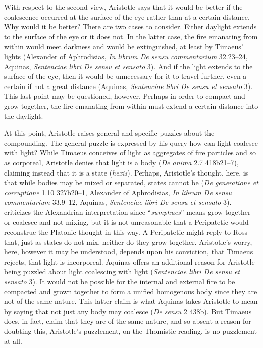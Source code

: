 With respect to the second view, Aristotle says that it would be better if the coalescence occurred at the surface of the eye rather than at a certain distance. Why would it be better? There are two cases to consider. Either daylight extends to the surface of the eye or it does not. In the latter case, the fire emanating from within would meet darkness and would be extinguished, at least by Timaeus' lights (Alexander of Aphrodisias, \emph{In librum De sensu commentarium} 32.23--24, Aquinas, \emph{Sentenciae libri De sensu et sensato} 3). And if the light extends to the surface of the eye, then it would be unnecessary for it to travel further, even a certain if not a great distance (Aquinas, \emph{Sentenciae libri De sensu et sensato} 3). This last point may be questioned, however. Perhaps in order to compact and grow together, the fire emanating from within must extend a certain distance into the daylight.

At this point, Aristotle raises general and specific puzzles about the compounding. The general puzzle is expressed by his query how can light coalesce with light? While Timaeus conceives of light as aggregates of fire particles and so as corporeal, Aristotle denies that light is a body (\emph{De anima} 2.7 418b21--7), claiming instead that it is a state (\emph{hexis}). Perhaps, Aristotle's thought, here, is that while bodies may be mixed or separated, states cannot be (\emph{De generatione et corruptione} 1.10 327b20--1, Alexander of Aphrodisias, \emph{In librum De sensu commentarium} 33.9--12, Aquinas, \emph{Sentenciae libri De sensu et sensato} 3). \citet[140--1]{Ross:1906xi} criticizes the Alexandrian interpretation since ``\emph{sumphues}'' means grow together or coalesce and not mixing, but it is not unreasonable that a Peripatetic would reconstrue the Platonic thought in this way. A Peripatetic might reply to Ross that, just as states do not mix, neither do they grow together. Aristotle's worry, here, however it may be understood, depends upon his conviction, that Timaeus rejects, that light is incorporeal. Aquinas offers an additional reason for Aristotle being puzzled about light coalescing with light (\emph{Sentenciae libri De sensu et sensato} 3). It would not be possible for the internal and external fire to be compacted and grown together to form a unified homogenous body since they are not of the same nature. This latter claim is what Aquinas takes Aristotle to mean by saying that not just any body may coalesce (\emph{De sensu} 2 438b). But Timaeus does, in fact, claim that they are of the same nature, and so absent a reason for doubting this, Aristotle's puzzlement, on the Thomistic reading, is no puzzlement at all. 

